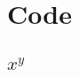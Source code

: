 \documentclass[11pt]{article}
\begin{document}
\section{Code}
\subsection{$x^{y}$}


\subsection{}


\end{document}
